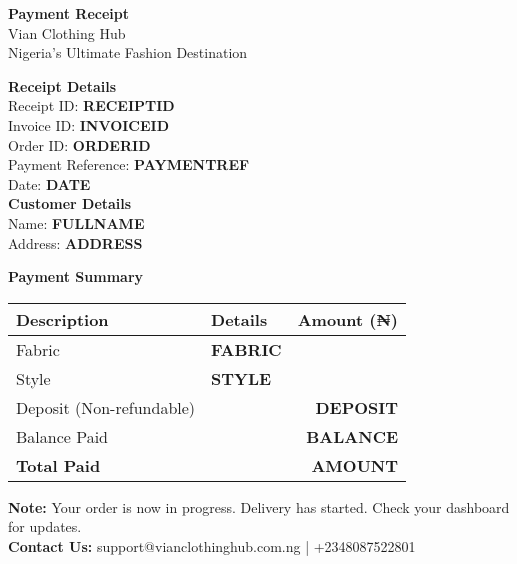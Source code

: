\documentclass[a4paper,12pt]{article}
\begin{document}
\begin{center}
    {\color{vianpurple}\textbf{\LARGE Payment Receipt}} \\
    \vspace{0.5cm}
    Vian Clothing Hub \\
    Nigeria's Ultimate Fashion Destination \\
    \vspace{0.5cm}
\end{center}

\begin{flushleft}
    \textbf{Receipt Details} \\
    Receipt ID: \textbf{RECEIPTID} \\
    Invoice ID: \textbf{INVOICEID} \\
    Order ID: \textbf{ORDERID} \\
    Payment Reference: \textbf{PAYMENTREF} \\
    Date: \textbf{DATE} \\
    \vspace{0.5cm}
    \textbf{Customer Details} \\
    Name: \textbf{FULLNAME} \\
    Address: \textbf{ADDRESS} \\
\end{flushleft}

\begin{center}
    \vspace{0.5cm}
    \textbf{Payment Summary}
    \begin{tabular}{llr}
        \toprule
        \textbf{Description} & \textbf{Details} & \textbf{Amount (₦)} \\
        \midrule
        Fabric & \textbf{FABRIC} & \\
        Style & \textbf{STYLE} & \\
        \midrule
        Deposit (Non-refundable) & & \textbf{DEPOSIT} \\
        Balance Paid & & \textbf{BALANCE} \\
        \midrule
        \textbf{Total Paid} & & \textbf{AMOUNT} \\
        \bottomrule
    \end{tabular}
\end{center}

\vspace{1cm}

\begin{flushleft}
    \textbf{Note:} Your order is now in progress. Delivery has started. Check your dashboard for updates. \\
    \textbf{Contact Us:} support@vianclothinghub.com.ng | +2348087522801
\end{flushleft}
\end{document}
